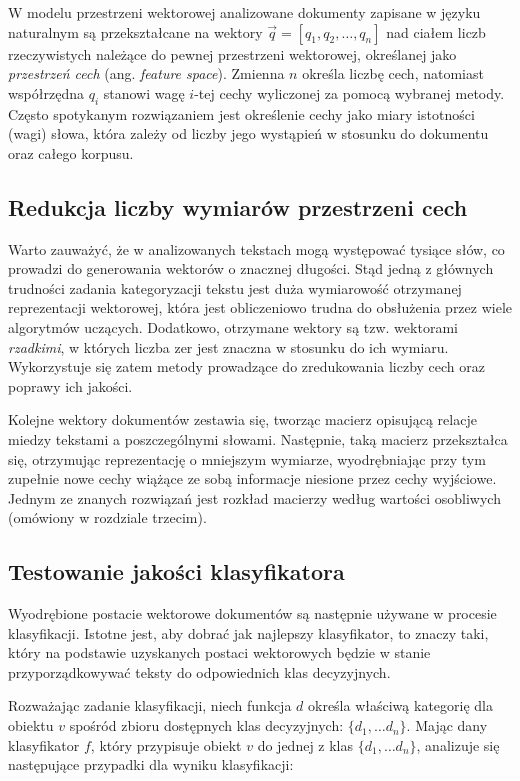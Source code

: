 \documentclass{pracamgr}
\begin{document}
W modelu przestrzeni wektorowej analizowane dokumenty zapisane w języku naturalnym są przekształcane na wektory $\vec{q} = [q_1, q_2, \ldots, q_n]$ nad ciałem liczb rzeczywistych należące do pewnej przestrzeni wektorowej, określanej jako \textit{przestrzeń cech} (ang. \textit{feature space}). Zmienna $n$ określa liczbę cech, natomiast współrzędna $q_i$ stanowi wagę $i$-tej cechy wyliczonej za pomocą wybranej metody. Często spotykanym rozwiązaniem jest określenie cechy jako miary istotności (wagi) słowa, która zależy od liczby jego wystąpień w stosunku do dokumentu oraz całego korpusu. 

\subsection{Redukcja liczby wymiarów przestrzeni cech}

Warto zauważyć, że w analizowanych tekstach mogą występować tysiące słów, co prowadzi do generowania wektorów o znacznej długości. Stąd jedną z głównych trudności zadania kategoryzacji tekstu jest duża wymiarowość otrzymanej reprezentacji wektorowej, która jest obliczeniowo trudna do obsłużenia przez wiele algorytmów uczących. Dodatkowo, otrzymane wektory są tzw. wektorami \textit{rzadkimi}, w których liczba zer jest znaczna w stosunku do ich wymiaru. Wykorzystuje się zatem metody prowadzące do zredukowania liczby cech oraz poprawy ich jakości.

Kolejne wektory dokumentów zestawia się, tworząc macierz opisującą relacje miedzy tekstami a poszczególnymi słowami. Następnie, taką macierz przekształca się, otrzymując reprezentację o mniejszym wymiarze, wyodrębniając przy tym zupełnie nowe cechy wiążące ze sobą informacje niesione przez cechy wyjściowe. Jednym ze znanych rozwiązań jest rozkład macierzy według wartości osobliwych (omówiony w rozdziale trzecim).

\subsection{Testowanie jakości klasyfikatora}

Wyodrębione postacie wektorowe dokumentów są następnie używane w procesie klasyfikacji. Istotne jest, aby dobrać jak najlepszy klasyfikator, to znaczy taki, który na podstawie uzyskanych postaci wektorowych będzie w stanie przyporządkowywać teksty do odpowiednich klas decyzyjnych. 

Rozważając zadanie klasyfikacji, niech funkcja $d$ określa właściwą kategorię dla obiektu $v$ spośród zbioru dostępnych klas decyzyjnych: $\{ d_1, \ldots d_n \}$.  Mając dany klasyfikator $f$, który przypisuje obiekt $v$ do jednej z klas $\{ d_1, \ldots d_n \}$, analizuje się następujące przypadki dla wyniku klasyfikacji:
\end{document}
